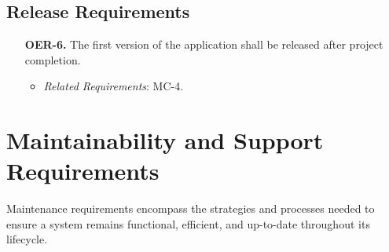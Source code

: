 \documentclass[12pt]{article}
\begin{document}
\subsection{Release Requirements}
\begin{enumerate}
  \item[\textbf{OER-6.}] The first version of the application shall be released after project completion.
    \begin{itemize}
      \item \textit{Related Requirements}: MC-4.
    \end{itemize}
\end{enumerate}

\section{Maintainability and Support Requirements}
Maintenance requirements encompass the strategies and processes needed to ensure
a system remains functional, efficient, and up-to-date throughout its lifecycle.
\end{document}
